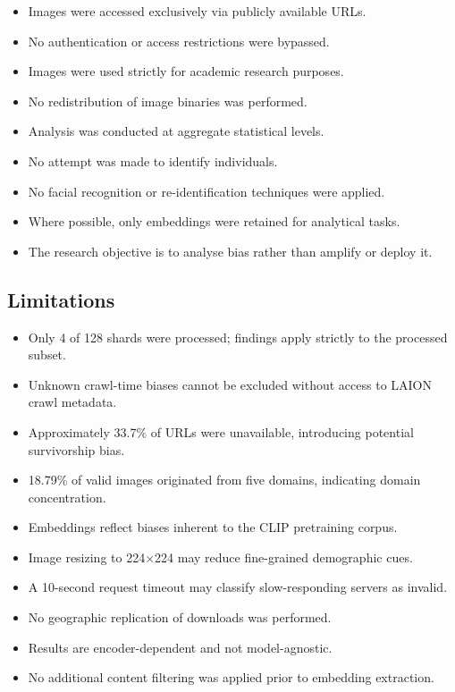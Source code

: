 \begin{itemize}
	\item Images were accessed exclusively via publicly available URLs.
	\item No authentication or access restrictions were bypassed.
	\item Images were used strictly for academic research purposes.
	\item No redistribution of image binaries was performed.
	\item Analysis was conducted at aggregate statistical levels.
	\item No attempt was made to identify individuals.
	\item No facial recognition or re-identification techniques were applied.
	\item Where possible, only embeddings were retained for analytical tasks.
	\item The research objective is to analyse bias rather than amplify or deploy it.
\end{itemize}

\subsection{Limitations}

\begin{itemize}
	\item Only 4 of 128 shards were processed; findings apply strictly to the processed subset.
	\item Unknown crawl-time biases cannot be excluded without access to LAION crawl metadata.
	\item Approximately 33.7\% of URLs were unavailable, introducing potential survivorship bias.
	\item 18.79\% of valid images originated from five domains, indicating domain concentration.
	\item Embeddings reflect biases inherent to the CLIP pretraining corpus.
	\item Image resizing to 224$\times$224 may reduce fine-grained demographic cues.
	\item A 10-second request timeout may classify slow-responding servers as invalid.
	\item No geographic replication of downloads was performed.
	\item Results are encoder-dependent and not model-agnostic.
	\item No additional content filtering was applied prior to embedding extraction.
\end{itemize}
















